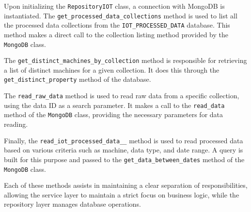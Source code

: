 Upon initializing the \texttt{RepositoryIOT} class, a connection with MongoDB is instantiated. The \texttt{get\_processed\_data\_collections} method is used to list all the processed data collections from the \texttt{IOT\_PROCESSED\_DATA} database. This method makes a direct call to the collection listing method provided by the \texttt{MongoDB} class.

The \texttt{get\_distinct\_machines\_by\_collection} method is responsible for retrieving a list of distinct machines for a given collection. It does this through the \texttt{get\_distinct\_property} method of the database.

The \texttt{read\_raw\_data} method is used to read raw data from a specific collection, using the data ID as a search parameter. It makes a call to the \texttt{read\_data} method of the \texttt{MongoDB} class, providing the necessary parameters for data reading.

Finally, the \texttt{read\_iot\_processed\_data\_\_} method is used to read processed data based on various criteria such as machine, data type, and date range. A query is built for this purpose and passed to the \texttt{get\_data\_between\_dates} method of the \texttt{MongoDB} class.

Each of these methods assists in maintaining a clear separation of responsibilities, allowing the service layer to maintain a strict focus on business logic, while the repository layer manages database operations.